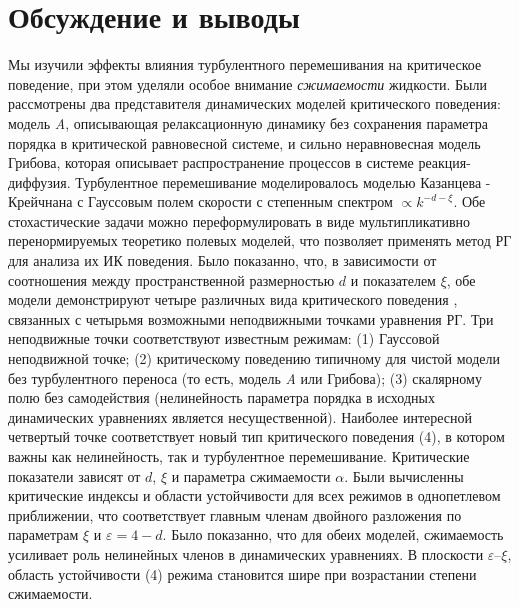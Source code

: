 \documentclass[a4paper,10pt]{article}
\begin{document}
\section{Обсуждение и выводы} \label{sec:Conc}
Мы изучили эффекты влияния турбулентного перемешивания на критическое поведение, при этом уделяли особое внимание {\it сжимаемости} жидкости.
Были рассмотрены два представителя динамических моделей критического поведения: модель {\it A}, описывающая релаксационную динамику без 
сохранения параметра порядка в критической равновесной системе, и сильно неравновесная модель Грибова, которая описывает распространение процессов в системе реакция-диффузия.
Турбулентное перемешивание моделировалось моделью Казанцева - Крейчнана с Гауссовым полем скорости с степенным спектром $\propto k^{-d-\xi}$.
Обе стохастические задачи можно переформулировать в виде мультипликативно перенормируемых  теоретико полевых моделей, что позволяет применять метод РГ для анализа их ИК поведения. 
Было показанно, что, в зависимости от соотношения между пространственной размерностью  $d$ и показателем  $\xi$, обе модели демонстрируют четыре различных вида критического поведения
, связанных с четырьмя возможными неподвижными точками уравнения РГ.
Три неподвижные точки соответствуют известным режимам: (1) Гауссовой неподвижной точке; (2) критическому поведению типичному для чистой модели без турбулентного переноса 
(то есть, модель {\it A} или Грибова); (3) скалярному полю без самодействия (нелинейность параметра порядка в исходных динамических
уравнениях является несущественной).
Наиболее интересной четвертый точке соответствует новый тип критического поведения (4), в котором важны как нелинейность, так и 
турбулентное перемешивание. Критические показатели зависят от $d$, $\xi$ и параметра сжимаемости $\alpha$.
Были вычисленны критические индексы и области устойчивости для всех режимов в однопетлевом приближении, 
что соответствует главным членам двойного разложения по параметрам $\xi$ и $\varepsilon=4-d$.
Было показанно, что для обеих моделей, сжимаемость усиливает роль нелинейных членов в динамических уравнениях.
В плоскости $\varepsilon$--$\xi$, область устойчивости (4) режима становится шире при возрастании степени сжимаемости.
\end{document}
